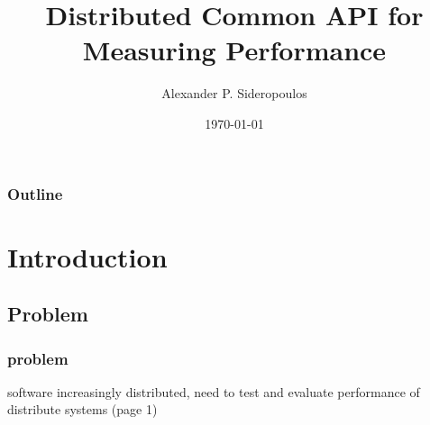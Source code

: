 
\title[dCAMP]{Distributed Common API for\\Measuring Performance} %

\author{Alexander P. Sideropoulos} %
\date{\today} %



\begin{frame}
\titlepage %
\end{frame}

\begin{frame}
\frametitle{Outline} %
\tableofcontents[pausesections] %
\end{frame}


\section{Introduction}

\subsection{Problem}
\begin{frame}
\frametitle{problem}
software increasingly distributed, need to test and evaluate performance of
distribute systems (page 1)
\end{frame}

